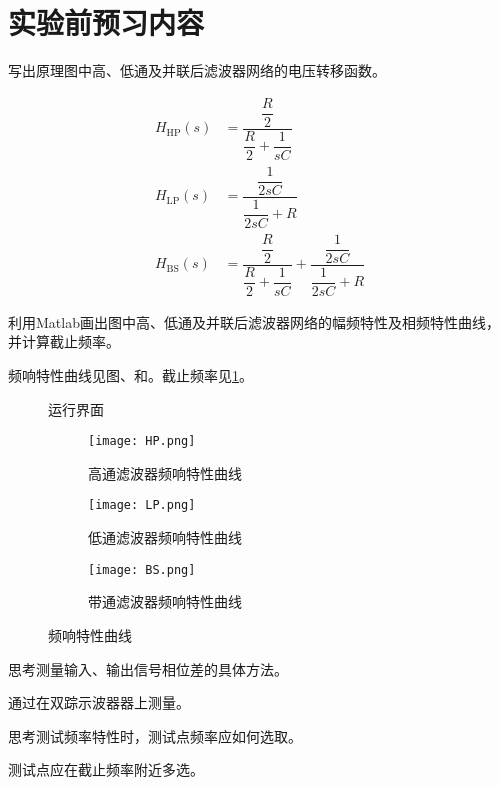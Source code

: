 \section{实验前预习内容}%
\label{sec:实验前预习内容\arabic{chapter}}
\begin{Exercise}
	写出原理图中高、低通及并联后滤波器网络的电压转移函数。
\end{Exercise}
\begin{Answer}
	\begin{align}
		H_\text{HP}(s)&=\dfrac{\dfrac{R}{2}}{\dfrac{R}{2}+\dfrac{1}{sC}}
		\\
		H_\text{LP}(s)&=\dfrac{\dfrac{1}{2sC}}{\dfrac{1}{2sC}+R}
		\\
		H_\text{BS}(s)&=\dfrac{\dfrac{R}{2}}{\dfrac{R}{2}+\dfrac{1}{sC}}+\dfrac{\dfrac{1}{2sC}}{\dfrac{1}{2sC}+R}
	\end{align}
\end{Answer}
\begin{Exercise}
	利用Matlab画出图中高、低通及并联后滤波器网络的幅频特性及相频特性曲线，并计算截止频率。
\end{Exercise}
\begin{Answer}
	频响特性曲线见图、和。截止频率见\ref{fig:运行界面code232.m}。
\end{Answer}
\begin{figure}[htpb]
	\centering
	\caption{运行界面}
	\label{fig:运行界面code232.m}
\end{figure}
\begin{figure}[htpb]
	\centering
	\begin{subfigure}[htpb]{.45\linewidth}
		\centering
		\texttt{[image: HP.png]}
		\caption{高通滤波器频响特性曲线}
		\label{fig:高通滤波器频响特性曲线}
	\end{subfigure}
	\quad
	\begin{subfigure}[htpb]{.45\linewidth}
		\centering
		\texttt{[image: LP.png]}
		\caption{低通滤波器频响特性曲线}
		\label{fig:低通滤波器频响特性曲线}
	\end{subfigure}
	\begin{subfigure}[htpb]{.45\linewidth}
		\centering
		\texttt{[image: BS.png]}
		\caption{带通滤波器频响特性曲线}
		\label{fig:带通滤波器频响特性曲线}
	\end{subfigure}
	\caption{频响特性曲线}
	\label{fig:频响特性曲线}
\end{figure}
\begin{Exercise}
	思考测量输入、输出信号相位差的具体方法。
\end{Exercise}
\begin{Answer}
	通过在双踪示波器器上测量。
\end{Answer}
\begin{Exercise}
	思考测试频率特性时，测试点频率应如何选取。
\end{Exercise}
\begin{Answer}
	测试点应在截止频率附近多选。
\end{Answer}
